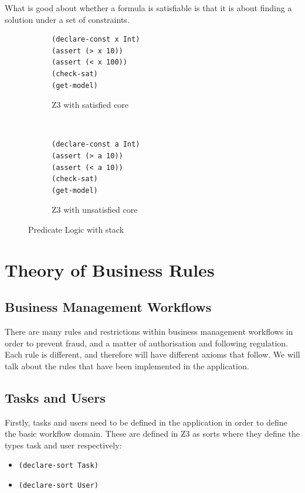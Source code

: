 \documentclass[a4paper]{report}
\begin{document}
What is good about whether a formula is satisfiable is that it is about finding a solution under a set of constraints. 
\begin{figure}[!htb]
\centering
\begin{subfigure}[b]{\textwidth}
\lstset{numbers=left, showspaces=false,
    showstringspaces=false, tabsize=2, breaklines=true,
    xleftmargin=5.0ex,
}
\lstset{basicstyle=\ttfamily}
\centering
\begin{lstlisting}[frame=single]
(declare-const x Int)
(assert (> x 10))
(assert (< x 100))
(check-sat)
(get-model)
\end{lstlisting}
\caption{Z3 with satisfied core}
\label{fig:Z3 with satisfied core}
\end{subfigure}\\
\begin{subfigure}[b]{\textwidth}
\lstset{numbers=left, showspaces=false,
    showstringspaces=false, tabsize=2, breaklines=true,
    xleftmargin=5.0ex,
}
\lstset{basicstyle=\ttfamily}
\begin{lstlisting}[frame=single]
(declare-const a Int)
(assert (> a 10))
(assert (< a 10))
(check-sat)
(get-model)
\end{lstlisting}
\caption{Z3 with unsatisfied core}
\label{fig:Z3 with unsatisfied core}
\end{subfigure}
\caption{Predicate Logic with stack}
\label{fig:Predicate Logic with stack}
\end{figure} 

\chapter{Theory of Business Rules}
\section{Business Management Workflows}
There are many rules and restrictions within business management workflows in order to prevent fraud, and a matter of authorisation and following regulation. Each rule is different, and therefore will have different axioms that follow. We will talk about the rules that have been implemented in the application.

\section{Tasks and Users}
Firstly, tasks and users need to be defined in the application in order to define the basic workflow domain. These are defined in Z3 as sorts where they define the types task and user respectively:
\begin{itemize}
\item \texttt{(declare-sort Task)}
\item \texttt{(declare-sort User)}
\end{itemize}
\end{document}
